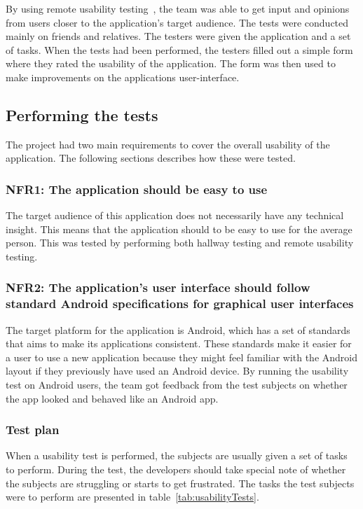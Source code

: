 
By using remote usability testing~\cite{remoteTest}, the team was able to get input and opinions from users closer to the application's target audience.
The tests were conducted mainly on friends and relatives. The testers were given the application and a set of tasks. When the tests had been performed, the testers filled out a simple form where they rated the usability of the application. The form was then used to make improvements on the applications user-interface.

\subsection{Performing the tests}
The project had two main requirements to cover the overall usability of the application. The following sections describes how these were tested.


\subsubsection{NFR1: The application should be easy to use}
The target audience of this application does not necessarily have any technical insight. This means that the application should to be easy to use for the average person. This was tested by performing both hallway testing and remote usability testing.

\subsubsection{NFR2: The application's user interface should follow standard Android specifications for graphical user interfaces}
The target platform for the application is Android, which has a set of standards that aims to make its applications consistent. These standards make it easier for a user to use a new application because they might feel familiar with the Android layout if they previously have used an Android device.
By running the usability test on Android users, the team got feedback from the test subjects on whether the app looked and behaved like an Android app.

\subsubsection{Test plan}
When a usability test is performed, the subjects are usually given a set of tasks to perform. During the test, the developers should take special note of whether the subjects are struggling or starts to get frustrated. The tasks the test subjects were to perform are presented in table~\ref{tab:usabilityTests}. 

